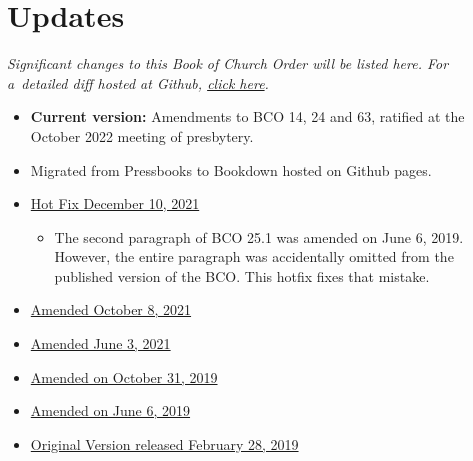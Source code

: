 \documentclass[
]{book}
\providecommand{\tightlist}{%
  \setlength{\itemsep}{0pt}\setlength{\parskip}{0pt}}
\begin{document}
\hypertarget{updates}{%
\chapter*{Updates}\label{updates}}

\emph{Significant changes to this Book of Church Order will be listed here. For a~detailed diff hosted at Github, \href{https://github.com/Evangel-Presbytery/evangel-bco}{click here}.}

\begin{itemize}
\tightlist
\item
  \textbf{Current version:} Amendments to BCO 14, 24 and 63, ratified at the October 2022 meeting of presbytery.
\item
  Migrated from Pressbooks to Bookdown hosted on Github pages.
\item
  \href{https://www.dropbox.com/sh/e5lszl09qec2wy0/AADMEzOS1C1Z7Ao4r4xyddHNa?dl=0}{Hot Fix December 10, 2021}

  \begin{itemize}
  \tightlist
  \item
    The second paragraph of BCO 25.1 was amended on June 6, 2019. However, the entire paragraph was accidentally omitted from the published version of the BCO. This hotfix fixes that mistake.
  \end{itemize}
\item
  \href{https://www.dropbox.com/sh/67fg23e5sksui6j/AAB6LRjZ2dld47gYz1G0jo-Fa?dl=0}{Amended October 8, 2021}
\item
  \href{https://www.dropbox.com/sh/z9buy77lg1ay8t0/AAAnPPQysyhwRPJ7lpLxl3Bma?dl=0}{Amended June 3, 2021}
\item
  \href{https://www.dropbox.com/sh/yhg7o7s6vlx0jha/AABM5so3BTahNcU7rUWsZHAGa?dl=0}{Amended on October 31, 2019}
\item
  \href{https://www.dropbox.com/sh/6e1mcd2n8vojvpv/AADWRZsciqNw1xteiuRA0lr3a?dl=0}{Amended on June 6, 2019}
\item
  \href{https://www.dropbox.com/sh/w46pitp7sevpepk/AAAH_HDpb8Qpck42Dkfw661Za?dl=0}{Original Version released February 28, 2019}
\end{itemize}
\end{document}
